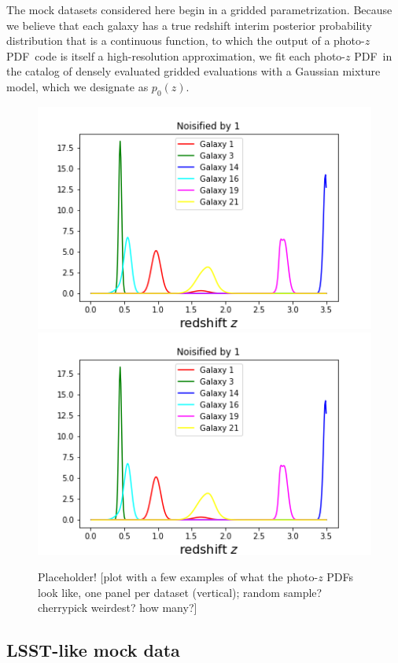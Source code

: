 \documentclass[\docopts]{\docclass}
\newcommand{\pz}{photo-$z$ PDF}
\begin{document}
The mock datasets considered here begin in a gridded parametrization.  Because 
we believe that each galaxy has a true redshift interim posterior probability 
distribution that is a continuous function, to which the output of a \pz\ code 
is itself a high-resolution approximation, we fit each \pz\ in the catalog of 
densely evaluated gridded evaluations with a Gaussian mixture model, which we 
designate as $p_{0}(z)$.

\begin{figure}
  \includegraphics[width=0.9\columnwidth]{figures/pz_placeholder.png}\\
  \includegraphics[width=0.9\columnwidth]{figures/pz_placeholder.png}
  \caption{Placeholder! [plot with a few examples of what the \pz s look like, 
one panel per dataset (vertical); random sample? cherrypick weirdest? how many?]
  \label{fig:pzs}}
\end{figure}

\subsection{LSST-like mock data}
\label{sec:LSST}
\end{document}
